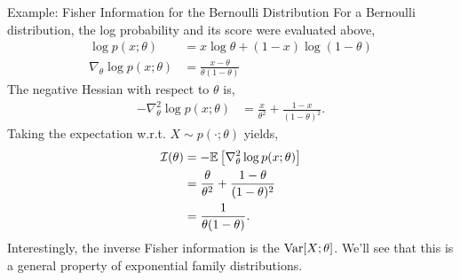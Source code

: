 \documentclass[aspectratio=169]{beamer}
\begin{document}
\begin{frame}[t,allowframebreaks]{Example: Fisher Information for the Bernoulli
Distribution}
For a Bernoulli distribution, the log
probability and its score were evaluated above, \begin{align*}
\log p(x; \theta) &= x \log \theta + (1 - x) \log (1 - \theta) \\
\nabla_\theta \log p(x; \theta) &= \frac{x - \theta}{\theta (1 - \theta)}
\end{align*} The negative Hessian with respect to \(\theta\) is,
\begin{align*}
- \nabla^2_\theta \log p(x; \theta) 
&= \frac{x}{\theta^2} + \frac{1 - x}{(1 - \theta)^2}.
\end{align*} Taking the expectation w.r.t. \(X \sim p(\cdot; \theta)\)
yields, \begin{align*}
\mathcal{I}(\theta) 
&= -\mathbb{E}\left[\nabla^2_\theta \log p(x; \theta) \right] \\
&= \frac{\theta}{\theta^2} + \frac{1- \theta}{(1-\theta)^2} \\
&= \frac{1}{\theta (1 - \theta)}.
\end{align*} Interestingly, the inverse Fisher information is the
\(\textrm{Var}[X; \theta]\). We'll see that this is a general property of
exponential family distributions. 
\end{frame}




\end{document}
